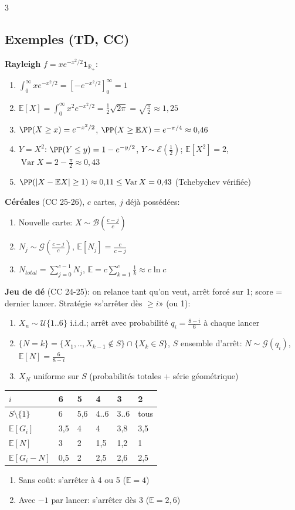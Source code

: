 \documentclass[12pt, a4paper]{article}
\newcommand{\E}{\mathbb{E}}
\newcommand{\R}{\mathbb{R}}
\newcommand{\Var}{\operatorname{Var}}
\newcommand{\ind}{\mathbf{1}}
\begin{document}
\begin{multicols*}{3}
	\subsection{Exemples (TD, CC)}
	\textbf{Rayleigh} $f=xe^{-x^2/2}\ind_{\R_+}$:
	\begin{enumerate}[\roman*.]
		\item $\int_0^\infty xe^{-x^2/2}=[-e^{-x^2/2}]_0^\infty=1$
		\item $\E[X]=\int_0^\infty x^2e^{-x^2/2}=\frac12\sqrt{2\pi}=\sqrt{\frac\pi2}\approx1{,}25$
		\item $\PP(X\geq x)=e^{-x^2/2}$, $\PP(X\geq\E X)=e^{-\pi/4}\approx0{,}46$
		\item $Y=X^2$: $\PP(Y\leq y)=1-e^{-y/2}$, $Y\sim\mathcal E(\frac12)$; $\E[X^2]=2$, $\Var X=2-\frac\pi2\approx0{,}43$
		\item $\PP(|X-\E X|\geq1)\approx0{,}11\leq\Var X=0{,}43$ (Tchebychev vérifiée)
	\end{enumerate}
	\colbreak
	\textbf{Céréales} (CC 25-26), $c$ cartes, $j$ déjà possédées:
	\begin{enumerate}[\roman*.]
		\item Nouvelle carte: $X\sim\mathcal B(\frac{c-j}c)$
		\item $N_j\sim\mathcal G(\frac{c-j}c)$, $\E[N_j]=\frac c{c-j}$
		\item $N_{total}=\sum_{j=0}^{c-1}N_j$, $\E=c\sum_{k=1}^c\frac1k\approx c\ln c$
	\end{enumerate}


	\textbf{Jeu de dé} (CC 24-25): on relance tant qu'on veut, arrêt forcé sur 1; score = dernier lancer. Stratégie «s'arrêter dès $\geq i$» (ou 1):
	\begin{enumerate}[\roman*.]
		\item $X_n\sim\mathcal U\{1..6\}$ i.i.d.; arrêt avec probabilité $q_i=\frac{8-i}6$ à chaque lancer
		\item $\{N=k\}=\{X_1,..,X_{k-1}\notin S\}\cap\{X_k\in S\}$, $S$ ensemble d'arrêt: $N\sim\mathcal G(q_i)$, $\E[N]=\frac6{8-i}$
		\item $X_N$ uniforme sur $S$ (probabilités totales + série géométrique)
	\end{enumerate}
	\begin{tabular}{|l|l|l|l|l|l|}
		\hline
		$i$             & 6   & 5   & 4   & 3    & 2   \\
		\hline
		$S\setminus\{1\}$ & 6 & 5,6 & 4..6 & 3..6 & tous \\
		$\E[G_i]$       & 3,5 & 4   & 4   & 3,8  & 3,5 \\
		$\E[N]$         & 3   & 2   & 1,5 & 1,2  & 1   \\
		$\E[G_i-N]$     & 0,5 & 2   & 2,5 & 2,6  & 2,5 \\
		\hline
	\end{tabular}
	\begin{enumerate}[\roman*.]
		\item Sans coût: s'arrêter à 4 ou 5 ($\E=4$)
		\item Avec $-1$ par lancer: s'arrêter dès 3 ($\E=2{,}6$)
	\end{enumerate}


\end{multicols*}
\end{document}
